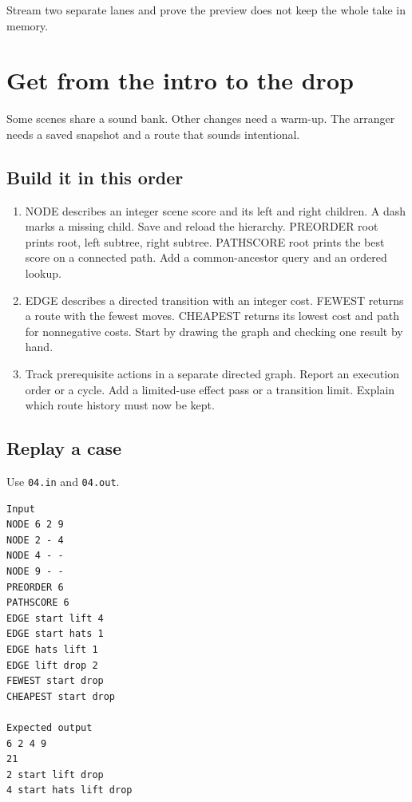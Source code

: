 \documentclass[11pt,letterpaper]{article}
\begin{document}
Stream two separate lanes and prove the preview does not keep the whole take in memory.

\clearpage

\section{Get from the intro to the drop}\label{groovebox:04}

Some scenes share a sound bank. Other changes need a warm-up. The arranger needs a saved snapshot and a route that sounds intentional.

\subsection*{Build it in this order}

\begin{enumerate}
\item NODE describes an integer scene score and its left and right children. A dash marks a missing child. Save and reload the hierarchy. PREORDER root prints root, left subtree, right subtree. PATHSCORE root prints the best score on a connected path. Add a common-ancestor query and an ordered lookup.
\item EDGE describes a directed transition with an integer cost. FEWEST returns a route with the fewest moves. CHEAPEST returns its lowest cost and path for nonnegative costs. Start by drawing the graph and checking one result by hand.
\item Track prerequisite actions in a separate directed graph. Report an execution order or a cycle. Add a limited-use effect pass or a transition limit. Explain which route history must now be kept.
\end{enumerate}

\subsection*{Replay a case}

Use \texttt{04.in} and \texttt{04.out}.

\begin{samepage}
\small
\begin{verbatim}
Input
NODE 6 2 9
NODE 2 - 4
NODE 4 - -
NODE 9 - -
PREORDER 6
PATHSCORE 6
EDGE start lift 4
EDGE start hats 1
EDGE hats lift 1
EDGE lift drop 2
FEWEST start drop
CHEAPEST start drop

Expected output
6 2 4 9
21
2 start lift drop
4 start hats lift drop
\end{verbatim}
\end{samepage}
\end{document}
